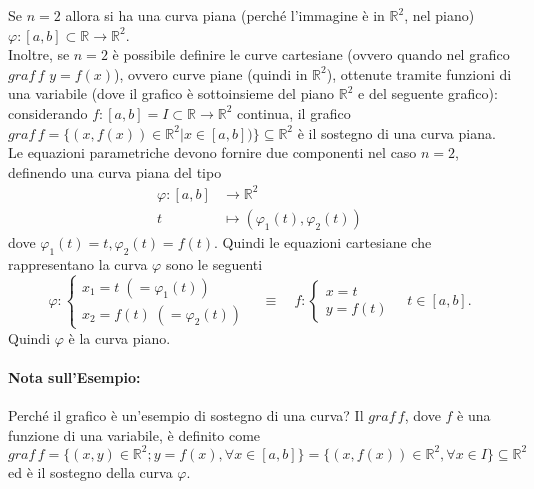 \begin{example}
	Se $n=2$ allora si ha una curva piana (perché l'immagine è in $\mathbb{R}^2$, nel piano) $\varphi:[a,b]\subset\mathbb{R}\rightarrow\mathbb{R}^2$.\\
	Inoltre, se $n=2$ è possibile definire le curve cartesiane (ovvero quando nel grafico $graf\, f$ $y=f(x)$), ovvero curve piane (quindi in $\mathbb{R}^2$), ottenute tramite funzioni di una variabile (dove il grafico è sottoinsieme del piano $\mathbb{R}^2$ e del seguente grafico): considerando $f:[a,b]=I\subset\mathbb{R}\rightarrow\mathbb{R}^2$ continua, il grafico $graf\, f=\{(x,f(x))\in\mathbb{R}^2|x\in[a,b])\}\subseteq\mathbb{R}^2$ è il sostegno di una curva piana.\\
	Le equazioni parametriche devono fornire due componenti nel caso $n=2$, definendo una curva piana del tipo
	\begin{equation}\label{eq:esempio_curva_R2}
		\begin{aligned}
			\varphi:[a,b]&\rightarrow\mathbb{R}^2\\
			t&\mapsto (\varphi_1(t),\varphi_2(t))
		\end{aligned}
	\end{equation}
	dove $\varphi_1(t)=t,\varphi_2(t)=f(t)$. Quindi le equazioni cartesiane che rappresentano la curva $\varphi$ sono le seguenti
	\begin{equation*}
		\varphi:
		\begin{cases}
			x_1 = t\; (=\varphi_1(t))\\
			x_2 = f(t)\; (=\varphi_2(t))
		\end{cases}\quad\equiv\quad f:
		\begin{cases}
			x=t\\
			y=f(t)
		\end{cases}\quad t\in[a,b].
	\end{equation*}
	Quindi $\varphi$ è la curva piano.
\end{example}

\paragraph{Nota sull'Esempio:} Perché il grafico è un'esempio di sostegno di una curva? Il $graf\, f$, dove $f$ è una funzione di una variabile, è definito come
\begin{equation}\label{eq:grafico_f_curva_cartesiana}
	graf\, f = \{(x,y)\in\mathbb{R}^2;y=f(x),\forall x\in[a,b]\}=\{(x,f(x))\in\mathbb{R}^2, \forall x\in I\}\subseteq\mathbb{R}^2
\end{equation}
ed è il sostegno della curva $\varphi$.

